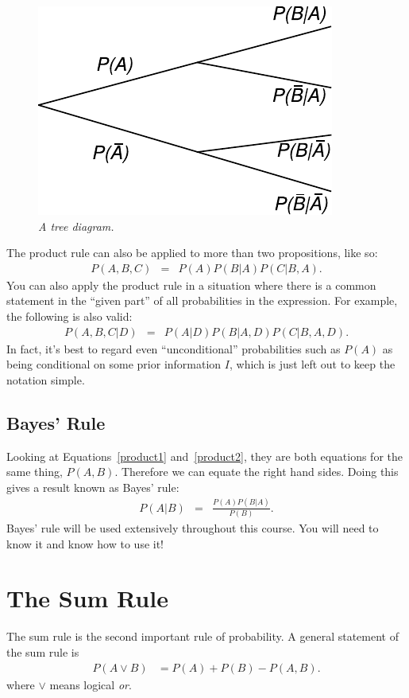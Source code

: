 \begin{figure}[!ht]
\begin{center}
\includegraphics[scale=0.9]{Figures/tree_diagram.pdf}
\caption{\it A tree diagram.\label{fig:tree_diagram}}
\end{center}
\end{figure}

The product rule can also be applied to more than two propositions, like so:
\begin{eqnarray}
P(A, B, C) &=& P(A)P(B|A)P(C|B,A).
\end{eqnarray}
You can also apply the product rule in a situation where there is a common
statement in the ``given part'' of all probabilities in the expression. For
example, the following is also valid:
\begin{eqnarray}
P(A, B, C | D) &=& P(A |D)P(B|A,D)P(C|B,A,D).
\end{eqnarray}
In fact, it's best to regard even ``unconditional'' probabilities such
as $P(A)$ as being conditional on some prior information $I$, which is just
left out to keep the notation simple.

\subsection{Bayes' Rule}
Looking at Equations~\ref{product1} and~\ref{product2}, they are both equations
for the same
thing, $P(A,B)$. Therefore we can equate the right hand sides. Doing this gives
a result known as Bayes' rule:
\begin{eqnarray}
P(A|B) &=& \frac{P(A)P(B|A)}{P(B)}. \label{bayes}
\end{eqnarray}
Bayes' rule will be used extensively throughout this course. You will need to
know it and know how to use it!

\section{The Sum Rule}
The sum rule is the second important rule of probability. A general statement
of the sum rule is
\begin{align}
P(A \vee B) &= P(A) + P(B) - P(A, B).\label{eqn:sum_rule}
\end{align}
where $\vee$ means logical {\em or}.

